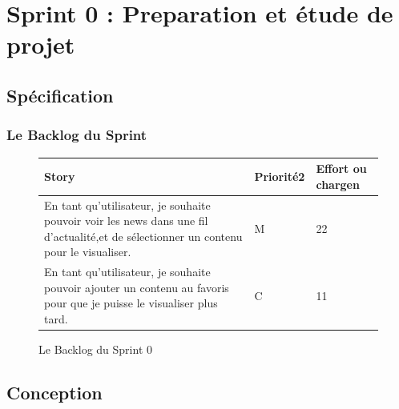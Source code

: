 \chapter{Sprint 0 : Preparation et étude de projet}
\label{Chapitre 3} %



\section{Spécification}
\subsection{Le Backlog du Sprint}


\begin{figure}[H]
\begin{tabular}{|p{7cm}|p{4cm}|p{4cm}|}
\hline
\textbf{Story} & \textbf{Priorité2 } & \textbf{Effort ou chargen} \\
\hline
En tant qu'utilisateur, je souhaite pouvoir voir les news dans une fil d'actualité,et de sélectionner un contenu pour le visualiser. & \begin{center}M\end{center} & \begin{center}22\end{center}\\
\hline
En tant qu'utilisateur, je souhaite pouvoir ajouter un contenu au favoris pour que je puisse le visualiser plus tard. & \begin{center}C\end{center} & \begin{center}11\end{center}\\
\hline
\end{tabular}
  \caption{Le Backlog du Sprint 0}
  \label{fig:Backlog}
\end{figure}
\section{Conception}
